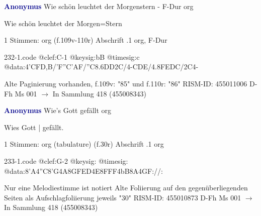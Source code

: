 \documentclass[twocolumn]{book}
\begin{document}
\newline \par \vspace{7pt} \textcolor{darkblue}{\textbf{Anonymus  }}
\newline Wie schön leuchtet der Morgenstern - F-Dur
\newline org
\newline \begin{itshape}[f.109v, heading:] Wie schön leuchtet der Morgen=Stern\end{itshape} 
\newline \textcolor{darkblue}{}  1 Stimmen: org  (f.109v-110r)
\newline Abschrift
.1  org, F-Dur  
\begin{filecontents*}{232-1.code}
@clef:C-1
@keysig:bB
@timesig:c
@data:4'CFD,B/'F''C'AF/''C{8.6DD}2C/4-CDE/4.8FEDC/2C4-
\end{filecontents*}
\newline
%
\newline Alte Paginierung vorhanden, f.109v: "85" und f.110r: "86"
\newline RISM-ID: 455011006
\newline D-Fh  Ms 001
\newline $\rightarrow$ In Sammlung 418 (455008343)
      
\newline \par \vspace{7pt} \textcolor{darkblue}{\textbf{Anonymus  }}
\newline Wie's Gott gefällt
\newline org
\newline \begin{itshape}[f.30r, at left:] Wies Gott | gefällt.\end{itshape} 
\newline \textcolor{darkblue}{}  1 Stimmen: org (tabulature)  (f.30r)
\newline Abschrift
.1  org  
\begin{filecontents*}{233-1.code}
@clef:G-2
@keysig:
@timesig:
@data:8'A4''C8'G4A8G{FE}D4E{8FFF}4bB8A4GF://:
\end{filecontents*}
\newline
%
\newline Nur eine Melodiestimme ist notiert
\newline Alte Foliierung auf den gegenüberliegenden Seiten als Aufschlagfoliierung jeweils "30"
\newline RISM-ID: 455010873
\newline D-Fh  Ms 001
\newline $\rightarrow$ In Sammlung 418 (455008343)
      
\end{document}
